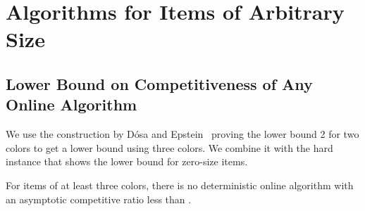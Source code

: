 \documentclass[11pt,a4paper]{article}
\begin{document}
\section{Algorithms for Items of Arbitrary Size}\label{sec:anySize}

\subsection{Lower Bound on Competitiveness of Any Online Algorithm}\label{sec:anySizeLB}

We use the construction by D\'osa and Epstein~\cite{DosEps14} proving the lower bound 2 for two colors
to get a lower bound  using three colors. We combine it with the hard instance that shows the lower bound
 for zero-size items. 

\begin{theorem} \label{thm:LBforMoreColorsAndGeneralSizes}
For items of at least three colors, there is no deterministic online algorithm with an asymptotic
competitive ratio less than . 
\end{theorem}
\end{document}
